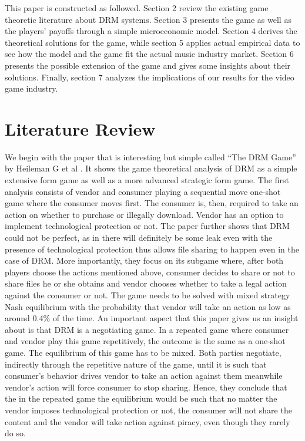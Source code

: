 \documentclass[a4paper,12pt]{article}
\numberwithin{equation}{section}
\begin{document}
This paper is constructed as followed. Section 2 review the existing
game theoretic literature about DRM systems. Section 3 presents the
game as well as the players' payoffs through a simple microeconomic
model. Section 4 derives the theoretical solutions for the game, while
section 5 applies actual empirical data to see how the model and the
game fit the actual music industry market. Section 6 presents the
possible extension of the game and gives some insights about their
solutions. Finally, section 7 analyzes the implications of our results
for the video game industry.

\section{Literature Review}

We begin with the paper that is interesting but simple called ``The DRM Game'' by Heileman G et al \cite{heileman2007}. It shows the game theoretical analysis of DRM as a simple extensive form game as well as a more advanced strategic form game. The first analysis consists of vendor and consumer playing a sequential move one-shot game where the consumer moves first. The consumer is, then, required to take an action on whether to purchase or illegally download. Vendor has an option to implement technological protection or not. The paper further shows that DRM could not be perfect, as in there will definitely be some leak even with the presence of technological protection thus allows file sharing to happen even in the case of DRM. More importantly, they focus on its subgame where, after both players choose the actions mentioned above, consumer decides to share or not to share files he or she obtains and vendor chooses whether to take a legal action against the consumer or not. The game needs to be solved with mixed strategy Nash equilibrium with the probability that vendor will take an action as low as around 0.4\% of the time. An important aspect that this paper gives us an insight about is that DRM is a negotiating game. In a repeated game where consumer and vendor play this game repetitively, the outcome is the same as a one-shot game. The equilibrium of this game has to be mixed. Both parties negotiate, indirectly through the repetitive nature of the game, until it is such that consumer’s behavior drives vendor to take an action against them meanwhile vendor’s action will force consumer to stop sharing. Hence, they conclude that the in the repeated game the equilibrium would be such that no matter the vendor imposes technological protection or not, the consumer will not share the content and the vendor will take action against piracy, even though they rarely do so.\\
\end{document}
